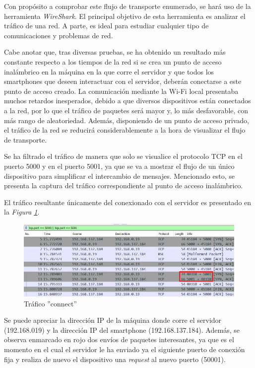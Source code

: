 \documentclass[a4paper,11pt]{book}
\begin{document}
			Con propósito a comprobar este flujo de transporte enumerado, se hará uso de la herramienta \textit{WireShark}. El principal objetivo de esta herramienta es analizar el tráfico de una red. A parte, es ideal para estudiar cualquier tipo de comunicaciones y problemas de red.
			
			Cabe anotar que, tras diversas pruebas, se ha obtenido un resultado más constante respecto a los tiempos de la red si se crea un punto de acceso inalámbrico en la máquina en la que corre el servidor y que todos los smartphones que deseen interactuar con el servidor, deberán conectarse a este punto de acceso creado. La comunicación mediante la Wi-Fi local presentaba muchos retardos inesperados, debido a que diversos dispositivos están conectados a la red, por lo que el tráfico de paquetes será mayor y, lo más desfavorable, con más rango de aleatoriedad.
			Además, disponiendo de un punto de acceso privado, el tráfico de la red se reducirá considerablemente a la hora de visualizar el flujo de transporte.
			
			Se ha filtrado el tráfico de manera que solo se visualice el protocolo TCP en el puerto 5000 y en el puerto 5001, ya que se va a mostrar el flujo de un único dispositivo  para simplificar el intercambio de mensajes. Mencionado esto, se presenta la captura del tráfico correspondiente al punto de acceso inalámbrico. 
			
			El tráfico resultante únicamente del conexionado con el servidor es presentado en la \textit{Figura \ref{connect}}.
			
\begin{figure}[hbtp]
\centering
\includegraphics[width = 15cm]{FIGURAS/trafico_connect.png}
\caption{Tráfico ''connect''}
\label{connect}
\end{figure}

Se puede apreciar la dirección IP de la máquina donde corre el servidor (192.168.019) y la dirección IP del smartphone (192.168.137.184). Además, se observa enmarcado en rojo dos envíos de paquetes interesantes, ya que es el momento en el cual el servidor le ha enviado ya el siguiente puerto de conexión fija y realiza de nuevo el dispositivo una \textit{request} al nuevo puerto (50001).
\end{document}
